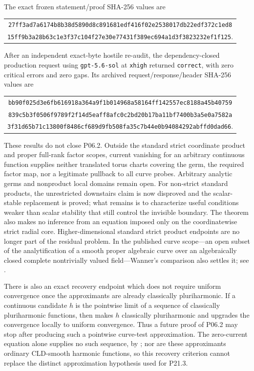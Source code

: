 The exact frozen statement/proof SHA-256 values are
\begin{center}
\small
\begin{tabular}{@{}c@{}}
\nolinkurl{27ff3ad7a6174b8b38d5890d8c891681edf416f02e2538017db22edf372c1ed8}\\
\nolinkurl{15ff9b3a28b63c1e3f37c104f27e30e77431f389ec694a1d3f3823232ef1f125}.
\end{tabular}
\end{center}
After an independent exact-byte hostile re-audit, the dependency-closed
production request using \texttt{gpt-5.6-sol} at \texttt{xhigh} returned
\texttt{correct}, with zero critical errors and zero gaps.  Its archived
request/response/header SHA-256 values are
\begin{center}
\small
\begin{tabular}{@{}c@{}}
\nolinkurl{bb90f025d3e6fb616918a364a9f1b014968a58164ff142557ec8188a45b40759}\\
\nolinkurl{839c5b3f0506f9789f2f14d5eaff8afc0c2bd20b17ba11bf7400b3a5e0a7582a}\\
\nolinkurl{3f31d65b71c13800f8486cf689d9fb508fa35c7b44e0b94084292abffd0dad66}.
\end{tabular}
\end{center}

These results do not close P06.2.  Outside the standard strict coordinate
product and proper full-rank factor scopes, current vanishing for an
arbitrary continuous function supplies neither translated torus charts
covering the germ, the required factor map, nor a legitimate pullback to all
curve probes.  Arbitrary analytic germs and nonproduct local domains remain
open.  For non-strict standard products, the unrestricted downstairs claim
is now disproved and the scalar-stable replacement is proved; what remains is
to characterize useful conditions weaker than scalar stability that still
control the invisible boundary.  The theorem also makes no inference from
an equation imposed only on the coordinatewise strict radial core.
Higher-dimensional standard strict product endpoints are no longer part of
the residual problem.  In the
published curve scope---an open subset of the analytification of a smooth
proper algebraic curve over an algebraically closed complete nontrivially
valued field---Wanner's comparison also settles it; see
.

There is also an exact recovery endpoint which does not require uniform
convergence once the approximants are already classically pluriharmonic.  If
a continuous candidate \(h\) is the pointwise limit of a sequence of
classically pluriharmonic functions, then
 makes \(h\) classically
pluriharmonic and upgrades the convergence locally to uniform convergence.
Thus a future proof of P06.2 may stop after producing such a pointwise
curve-test approximation.  The zero-current equation alone supplies no
such sequence, by ; nor are these
approximants ordinary CLD-smooth harmonic functions, so this recovery
criterion cannot replace the distinct approximation hypothesis used for
P21.3.

